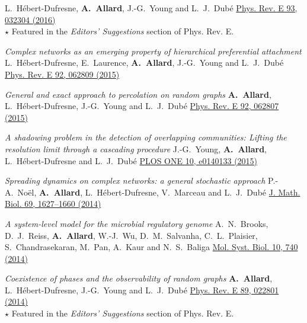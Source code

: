 \documentclass[11pt]{article}
\makeatletter
\newcommand{\reversearabic}[1]{\expandafter\@reversearabic\csname c@#1\endcsname}
\newcommand{\@reversearabic}[1]{%
  \number\numexpr\getrefnumber{this@etaremune@\romannumeral\c@etaremune}-#1+1\relax
}
\newcounter{etaremune}
\newenvironment{etaremune}[1][]{%
  \stepcounter{etaremune}%
  \begin{enumerate}[label=\reversearabic*.,#1]%
}{%
  \edef\@currentlabel{\the\csname c@\@enumctr\endcsname}%
  \label{this@etaremune@\romannumeral\c@etaremune}%
  \end{enumerate}%
}
\makeatother
\begin{document}
\begin{etaremune}[itemsep=0.5em, label={[A\reversearabic*]}]
{  L.~H\'ebert-Dufresne, \textbf{A.~Allard}, J.-G.~Young and L.~J.~Dub\'e\split
  \href{https://doi.org/10.1103/PhysRevE.93.032304}{Phys. Rev. E 93, 032304 (2016)}\\
  {\footnotesize $\star$ Featured in the \textit{Editors' Suggestions} section of Phys. Rev. E.}}
%
  \item \parbox[t]{\textwidth-30pt}{\textit{Complex networks as an emerging property of hierarchical preferential attachment}\split
  L.~H\'ebert-Dufresne, E.~Laurence, \textbf{A.~Allard}, J.-G.~Young and L.~J.~Dub\'e\split
  \href{https://doi.org/10.1103/PhysRevE.92.062809}{Phys. Rev. E 92, 062809 (2015)}}
%
  \item \parbox[t]{\textwidth-30pt}{\textit{General and exact approach to percolation on random graphs}\split
  \textbf{A.~Allard}, L.~H\'ebert-Dufresne, J.-G.~Young and L.~J.~Dub\'e\split
  \href{https://doi.org/10.1103/PhysRevE.92.062807}{Phys. Rev. E 92, 062807 (2015)}}
%
  \item \parbox[t]{\textwidth-30pt}{\textit{A shadowing problem in the detection of overlapping communities: Lifting the resolution limit through a cascading procedure}\split
  J.-G.~Young, \textbf{A.~Allard}, L.~H\'ebert-Dufresne and L.~J.~Dub\'e\split
  \href{https://doi.org/10.1371/journal.pone.0140133}{PLOS ONE 10, e0140133 (2015)}}
%
  \item \parbox[t]{\textwidth-30pt}{\textit{Spreading dynamics on complex networks: a general stochastic approach}\split
  P.-A.~No\"el, \textbf{A.~Allard}, L.~H\'ebert-Dufresne, V.~Marceau and L.~J.~Dub\'e\split
  \href{https://doi.org/10.1007/s00285-013-0744-9}{J. Math. Biol. 69, 1627--1660 (2014)}}
%
  \item \parbox[t]{\textwidth-30pt}{\textit{A system-level model for the microbial regulatory genome}\split
  A.~N.~Brooks, D.~J.~Reiss, \textbf{A.~Allard}, W.-J.~Wu, D.~M.~Salvanha, C.~L.~Plaisier, S.~Chandrasekaran, M.~Pan, A.~Kaur and N.~S.~Baliga\split
  \href{https://doi.org/10.15252/msb.20145160}{Mol. Syst. Biol. 10, 740 (2014)}}
%
  \item \parbox[t]{\textwidth-30pt}{\textit{Coexistence of phases and the observability of random graphs}\split
  \textbf{A.~Allard}, L.~H\'ebert-Dufresne, J.-G.~Young and L.~J.~Dub\'e\split
  \href{https://doi.org/10.1103/PhysRevE.89.022801}{Phys. Rev. E 89, 022801 (2014)}\\
  {\footnotesize $\star$ Featured in the \textit{Editors' Suggestions} section of Phys. Rev. E.}}

\end{etaremune}
\end{document}
